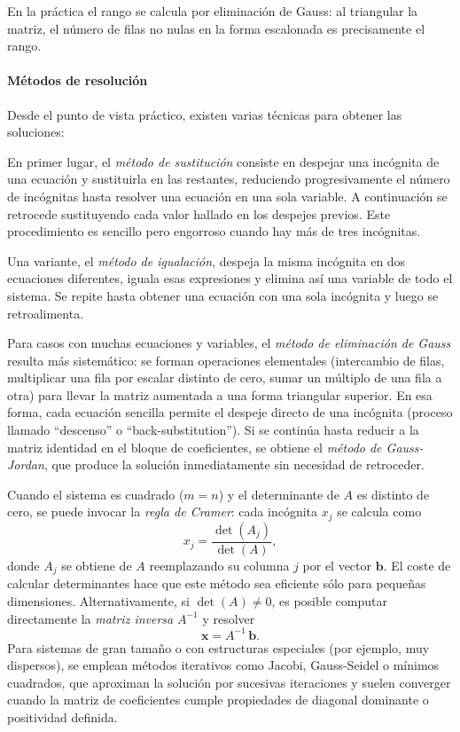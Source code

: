 En la práctica el rango se calcula por eliminación de Gauss: al triangular la matriz, el número de filas no nulas en la forma escalonada es precisamente el rango.

\vspace{5pt}

\paragraph{Métodos de resolución}

Desde el punto de vista práctico, existen varias técnicas para obtener las soluciones:

En primer lugar, el \textit{método de sustitución} consiste en despejar una incógnita de una ecuación y sustituirla en las restantes, reduciendo progresivamente el número de incógnitas hasta resolver una ecuación en una sola variable. A continuación se retrocede sustituyendo cada valor hallado en los despejes previos. Este procedimiento es sencillo pero engorroso cuando hay más de tres incógnitas.

Una variante, el \textit{método de igualación}, despeja la misma incógnita en dos ecuaciones diferentes, iguala esas expresiones y elimina así una variable de todo el sistema. Se repite hasta obtener una ecuación con una sola incógnita y luego se retroalimenta.

Para casos con muchas ecuaciones y variables, el \textit{método de eliminación de Gauss} resulta más sistemático: se forman operaciones elementales (intercambio de filas, multiplicar una fila por escalar distinto de cero, sumar un múltiplo de una fila a otra) para llevar la matriz aumentada a una forma triangular superior. En esa forma, cada ecuación sencilla permite el despeje directo de una incógnita (proceso llamado ``descenso'' o ``back-substitution''). Si se continúa hasta reducir a la matriz identidad en el bloque de coeficientes, se obtiene el \textit{método de Gauss-Jordan}, que produce la solución inmediatamente sin necesidad de retroceder.

Cuando el sistema es cuadrado (\(m=n\)) y el determinante de \(A\) es distinto de cero, se puede invocar la \textit{regla de Cramer}: cada incógnita \(x_j\) se calcula como
\[
x_j = \frac{\det(A_j)}{\det(A)},
\]
donde \(A_j\) se obtiene de \(A\) reemplazando su columna \(j\) por el vector \(\mathbf{b}\). El coste de calcular determinantes hace que este método sea eficiente sólo para pequeñas dimensiones. Alternativamente, si \(\det(A)\neq 0\), es posible computar directamente la \textit{matriz inversa} \(A^{-1}\) y resolver
\[
\mathbf{x} = A^{-1}\,\mathbf{b}.
\]
Para sistemas de gran tamaño o con estructuras especiales (por ejemplo, muy dispersos), se emplean métodos iterativos como Jacobi, Gauss-Seidel o mínimos cuadrados, que aproximan la solución por sucesivas iteraciones y suelen converger cuando la matriz de coeficientes cumple propiedades de diagonal dominante o positividad definida.

